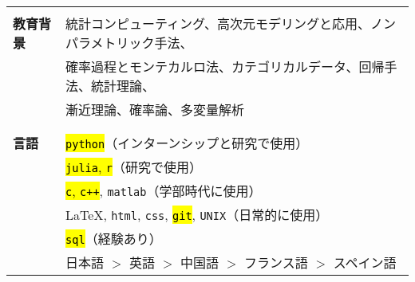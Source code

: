 \documentclass[utf8,letterpaper,oneside]{article}
\begin{document}
\begin{center}
\begin{tabular}{l l}
                      &                                                                                                \\
  \textbf{教育背景}   & 統計コンピューティング、高次元モデリングと応用、ノンパラメトリック手法、                       \\
                      & 確率過程とモンテカルロ法、カテゴリカルデータ、回帰手法、統計理論、                             \\
                      & 漸近理論、確率論、多変量解析                                                                   \\
                      &                                                                                                \\ \hline
                      &                                                                                                \\
  \textbf{言語}       & \hl{\texttt{python}}（インターンシップと研究で使用）                                           \\
                      & \hl{\texttt{julia}, \texttt{r}}（研究で使用）                                                  \\
                      & \hl{\texttt{c}, \texttt{c++}}, \texttt{matlab}（学部時代に使用）                               \\
                      & \LaTeX, \texttt{html}, \texttt{css}, \hl{\texttt{git}}, \texttt{UNIX}（日常的に使用）          \\
                      & \hl{\texttt{sql}}（経験あり）                                                                  \\
                      & 日本語 $>$ 英語 $>$ 中国語 $>$ フランス語 $>$ スペイン語                                       \\
 \end{tabular}
\end{center}
\end{document}

